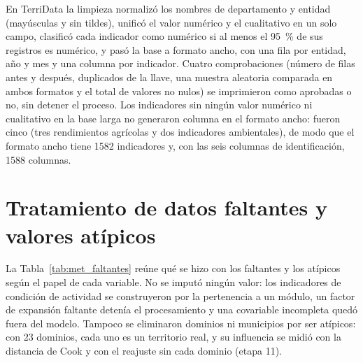 En TerriData la limpieza normalizó los nombres de departamento y entidad (mayúsculas y sin tildes), unificó el valor numérico y el cualitativo en un solo campo, clasificó cada indicador como numérico si al menos el 95~\% de sus registros es numérico, y pasó la base a formato ancho, con una fila por entidad, año y mes y una columna por indicador. Cuatro comprobaciones (número de filas antes y después, duplicados de la llave, una muestra aleatoria comparada en ambos formatos y el total de valores no nulos) se imprimieron como aprobadas o no, sin detener el proceso. Los indicadores sin ningún valor numérico ni cualitativo en la base larga no generaron columna en el formato ancho: fueron cinco (tres rendimientos agrícolas y dos indicadores ambientales), de modo que el formato ancho tiene \num{1582} indicadores y, con las seis columnas de identificación, \num{1588} columnas.

\section{Tratamiento de datos faltantes y valores atípicos}
\label{sec:met_faltantes}

La Tabla~\ref{tab:met_faltantes} reúne qué se hizo con los faltantes y los atípicos según el papel de cada variable. No se imputó ningún valor: los indicadores de condición de actividad se construyeron por la pertenencia a un módulo, un factor de expansión faltante detenía el procesamiento y una covariable incompleta quedó fuera del modelo. Tampoco se eliminaron dominios ni municipios por ser atípicos: con 23 dominios, cada uno es un territorio real, y su influencia se midió con la distancia de Cook y con el reajuste sin cada dominio (etapa 11).

